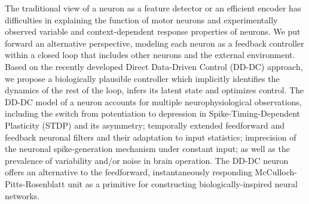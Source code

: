 The traditional view of a neuron as a feature detector or an efficient encoder has difficulties in explaining the function of motor neurons and experimentally observed variable and context-dependent response properties of neurons. We put forward an alternative perspective, modeling each neuron as a feedback controller within a closed loop that includes other neurons and the external environment. Based on the recently developed Direct Data-Driven Control (DD-DC) approach, we propose a biologically plausible controller which implicitly identifies the dynamics of the rest of the loop, infers its latent state and optimizes control. The DD-DC model of a neuron accounts for multiple neurophysiological observations, including the switch from potentiation to depression in Spike-Timing-Dependent Plasticity (STDP) and its asymmetry; temporally extended feedforward and feedback neuronal filters and their adaptation to input statistics; imprecision of the neuronal spike-generation mechanism under constant input; as well as the prevalence of variability and/or noise in brain operation. The DD-DC neuron offers an alternative to the feedforward, instantaneously responding McCulloch-Pitts-Rosenblatt unit as a primitive for constructing biologically-inspired neural networks.